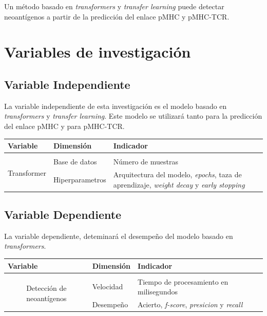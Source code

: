 \documentclass[a4paper]{article}
\begin{document}
Un método basado en \textit{transformers} y \textit{transfer learning} puede detectar neoantígenos a partir de la predicción del enlace pMHC y pMHC-TCR.

\section{Variables de investigación}


\subsection{Variable Independiente}

La variable independiente de esta investigación es el modelo basado en \textit{transformers} y \textit{transfer learning}. Este modelo se utilizará tanto para la predicción del enlace pMHC y para pMHC-TCR.

\begin{table}[H]
	\centering
	\setlength{\tabcolsep}{0.5em} %
	{\renewcommand{\arraystretch}{1.2}%
	\begin{tabular}{clp{8cm}}
		\multicolumn{1}{l}{\textbf{Variable}}      & \textbf{Dimensión} & \textbf{Indicador}   \\ \hline                   \\
		\multirow{2}{*}{Transformer} & Base de datos          & Número de muestras \\
		& Hiperparametros          & Arquitectura del modelo, \textit{epochs}, taza de aprendizaje,  \textit{weight decay}  y \textit{early stopping}
	\end{tabular}
}
\end{table}


\subsection{Variable Dependiente}

La variable dependiente, deteminará el desempeño del modelo basado en \textit{transformers}.

\begin{table}[H]
	\centering
	\setlength{\tabcolsep}{0.5em} %
	{\renewcommand{\arraystretch}{1.2}%
	\begin{tabular}{clp{8cm}}
		\multicolumn{1}{l}{\textbf{Variable}}      & \textbf{Dimensión} & \textbf{Indicador}   \\ \hline                   \\
		\multirow{2}{*}{Detección de neoantígenos} & Velocidad          & Tiempo de procesamiento en milisegundos \\
		& Desempeño          & Acierto, \textit{f-score}, \textit{presicion} y \textit{recall}   
	\end{tabular}
}
\end{table}
\end{document}
